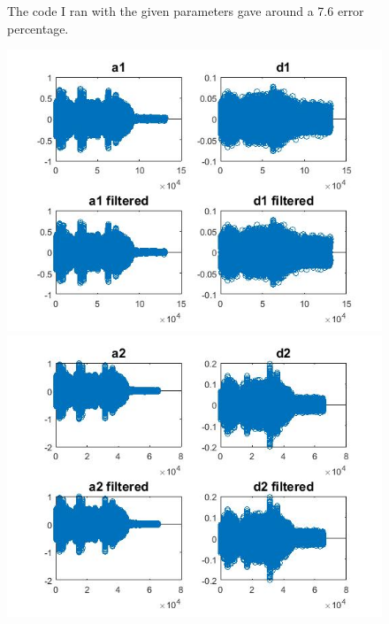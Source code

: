 \documentclass{article}
\begin{document}
\begin{figure}[H]
The code I ran with the given parameters gave around a 7.6 error percentage.

\includegraphics[scale=.5]{a1d1}
\includegraphics[scale=.5]{a2d2}

  \end{figure}
\end{document}
